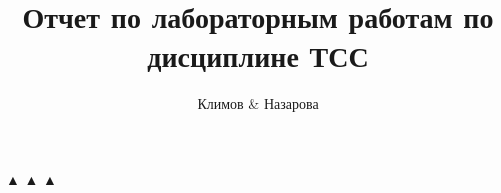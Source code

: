 \documentclass[10pt,a4paper]{article}
\author{Климов & Назарова}
\title{Отчет по лабораторным работам по дисциплине ТСС}
\begin{document}
 ▲ 
▲ ▲
\end{document}

